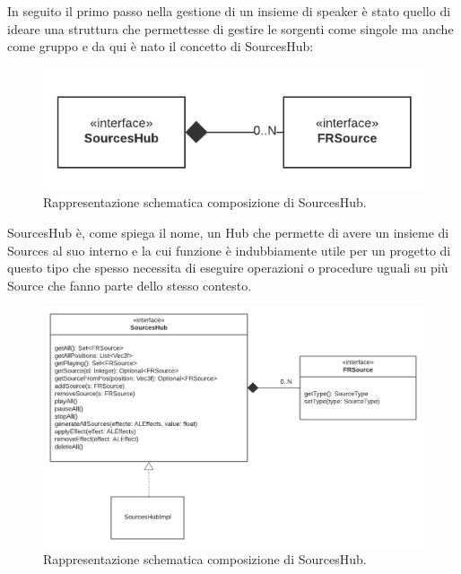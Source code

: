 \documentclass[a4paper,12pt]{report}
\begin{document}
In seguito il primo passo nella gestione di un insieme di speaker è stato quello di ideare una struttura che permettesse di gestire le sorgenti come singole ma anche come gruppo e da qui è nato il concetto di SourcesHub:
%
\begin{figure}[H]
\centering{}
\includegraphics[width=\textwidth]{img/source/SourcesHub-Source.png}
\caption{Rappresentazione schematica composizione di SourcesHub.}
\label{img:sourcesHubIdea}
\end{figure}

SourcesHub è, come spiega il nome, un Hub che permette di avere un insieme di Sources al suo interno e la cui funzione è indubbiamente utile per un progetto di questo tipo che spesso necessita di eseguire operazioni o procedure uguali su più Source che fanno parte dello stesso contesto.
%
\begin{figure}[H]
\centering{}
\includegraphics[width=\textwidth]{img/source/SourcesHub-Source-deeper.png}
\caption{Rappresentazione schematica composizione di SourcesHub.}
\label{img:sourcesHub}
\end{figure}
\end{document}
